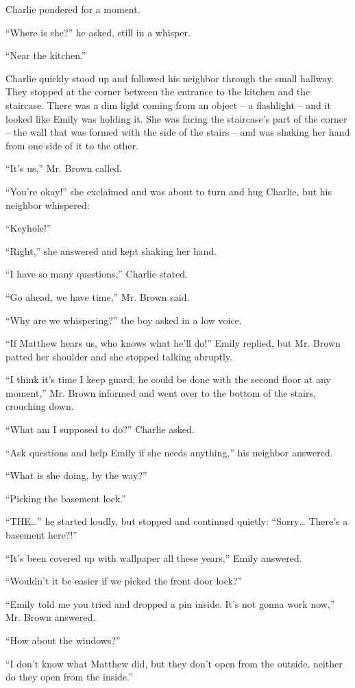 Charlie pondered for a moment.

“Where is she?” he asked, still in a whisper.

“Near the kitchen.”

Charlie quickly stood up and followed his neighbor through the small hallway. They stopped at the corner between the entrance to the kitchen and the staircase. There was a dim light coming from an object – a flashlight – and it looked like Emily was holding it. She was facing the staircase’s part of the corner – the wall that was formed with the side of the stairs – and was shaking her hand from one side of it to the other.

“It’s us,” Mr. Brown called.

“You’re okay!” she exclaimed and was about to turn and hug Charlie, but his neighbor whispered:

“Keyhole!”

“Right,” she answered and kept shaking her hand.

“I have so many questions,” Charlie stated.

“Go ahead, we have time,” Mr. Brown said.

“Why are we whispering?” the boy asked in a low voice.

“If Matthew hears us, who knows what he’ll do!” Emily replied, but Mr. Brown patted her shoulder and she stopped talking abruptly.

“I think it’s time I keep guard, he could be done with the second floor at any moment,” Mr. Brown informed and went over to the bottom of the stairs, crouching down.

“What am I supposed to do?” Charlie asked.

“Ask questions and help Emily if she needs anything,” his neighbor answered.

“What is she doing, by the way?”

“Picking the basement lock.”

“THE…” he started loudly, but stopped and continued quietly: “Sorry… There’s a basement here?!”

“It’s been covered up with wallpaper all these years,” Emily answered.

“Wouldn’t it be easier if we picked the front door lock?”

“Emily told me you tried and dropped a pin inside. It’s not gonna work now,” Mr. Brown answered.

“How about the windows?”

“I don’t know what Matthew did, but they don’t open from the outside, neither do they open from the inside.”

